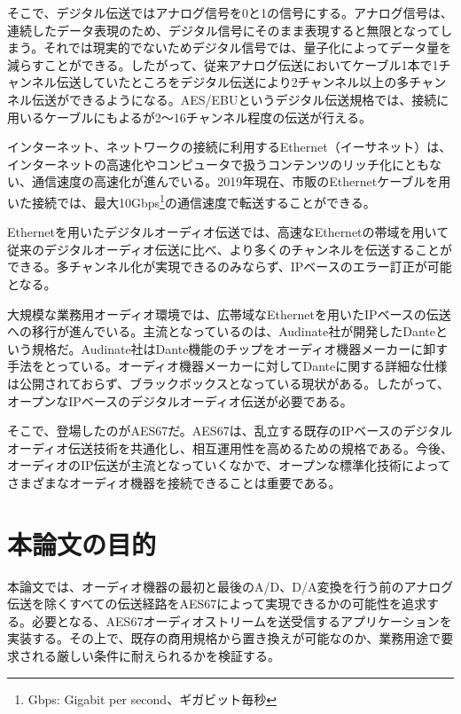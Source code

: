 そこで、デジタル伝送ではアナログ信号を0と1の信号にする。アナログ信号は、連続したデータ表現のため、デジタル信号にそのまま表現すると無限となってしまう。それでは現実的でないためデジタル信号では、量子化によってデータ量を減らすことができる\cite{analog-io}。したがって、従来アナログ伝送においてケーブル1本で1チャンネル伝送していたところをデジタル伝送により2チャンネル以上の多チャンネル伝送ができるようになる。AES/EBUというデジタル伝送規格では、接続に用いるケーブルにもよるが2〜16チャンネル程度の伝送が行える。

インターネット、ネットワークの接続に利用するEthernet（イーサネット）は、インターネットの高速化やコンピュータで扱うコンテンツのリッチ化にともない、通信速度の高速化が進んでいる。2019年現在、市販のEthernetケーブルを用いた接続では、最大10Gbps\footnote{Gbps: Gigabit per second、ギガビット毎秒}の通信速度で転送することができる。



Ethernetを用いたデジタルオーディオ伝送では、高速なEthernetの帯域を用いて従来のデジタルオーディオ伝送に比べ、より多くのチャンネルを伝送することができる。多チャンネル化が実現できるのみならず、IPベースのエラー訂正が可能となる。

大規模な業務用オーディオ環境では、広帯域なEthernetを用いたIPベースの伝送への移行が進んでいる。主流となっているのは、Audinate社が開発したDanteという規格だ。Audinate社はDante機能のチップをオーディオ機器メーカーに卸す手法をとっている。オーディオ機器メーカーに対してDanteに関する詳細な仕様は公開されておらず、ブラックボックスとなっている現状がある。したがって、オープンなIPベースのデジタルオーディオ伝送が必要である。

そこで、登場したのがAES67だ。AES67は、乱立する既存のIPベースのデジタルオーディオ伝送技術を共通化し、相互運用性を高めるための規格である。今後、オーディオのIP伝送が主流となっていくなかで、オープンな標準化技術によってさまざまなオーディオ機器を接続できることは重要である。

\section{本論文の目的}

本論文では、オーディオ機器の最初と最後のA/D、D/A変換を行う前のアナログ伝送を除くすべての伝送経路をAES67によって実現できるかの可能性を追求する。必要となる、AES67オーディオストリームを送受信するアプリケーションを実装する。その上で、既存の商用規格から置き換えが可能なのか、業務用途で要求される厳しい条件に耐えられるかを検証する。

